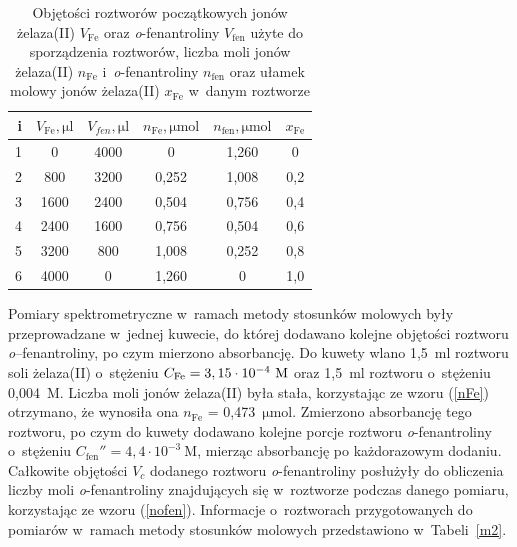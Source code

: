 \documentclass[12pt]{article}
\begin{document}
\begin{table}[H]
    \caption{Objętości roztworów początkowych jonów żelaza(II) $V_{\mathrm{Fe}}$ oraz \textit{o}-fenantroliny $V_{\mathrm{fen}}$ użyte do sporządzenia roztworów, liczba moli jonów żelaza(II) $n_{\mathrm{Fe}}$ i~\textit{o}-fenantroliny $n_{\mathrm{fen}}$ oraz ułamek molowy jonów żelaza(II) $x_{\mathrm{Fe}}$ w~danym roztworze}
    \centering
\begin{tabular}{|r|ccccc|}
\hline
i & $V_{\mathrm{Fe}}, \mathrm{\mu l}$ & $V_{fen}, \mathrm{\mu l}$ & $n_{\mathrm{Fe}}, \mathrm{\mu mol}$ & $n_{\mathrm{fen}}, \mathrm{\mu mol}$ & $x_{\mathrm{Fe}}$ \\ \hline
1 & 0                        & 4000                        & 0                          & 1,260                         & 0        \\
2 & 800                      & 3200                        & 0,252                      & 1,008                         & 0,2      \\
3 & 1600                     & 2400                        & 0,504                      & 0,756                         & 0,4      \\
4 & 2400                     & 1600                        & 0,756                      & 0,504                         & 0,6      \\
5 & 3200                     & 800                         & 1,008                      & 0,252                         & 0,8      \\
6 & 4000                     & 0                           & 1,260                      & 0                             & 1,0      \\ \hline
\end{tabular}
    \label{m1}
\end{table}


Pomiary spektrometryczne w~ramach metody stosunków molowych były przeprowadzane w~jednej kuwecie, do której dodawano kolejne objętości roztworu \textit{o}--fenantroliny, po czym mierzono absorbancję. Do kuwety wlano 1,5~ml roztworu soli żelaza(II) o~stężeniu $C_{\ce{Fe}}= \mathrm{3,15 \cdot 10^{-4}~M}$ oraz 1,5~ml roztworu  o~stężeniu 0,004~M. Liczba moli jonów żelaza(II) była stała, korzystając ze wzoru (\ref{nFe}) otrzymano, że wynosiła ona $n_{\mathrm{Fe}}$ = 0,473~$\mathrm{\mu mol}$. Zmierzono absorbancję tego roztworu, po czym do kuwety dodawano kolejne porcje roztworu \textit{o}-fenantroliny o~stężeniu $C_{\mathrm{fen}}'' = \mathrm{4,4 \cdot 10^{-3}~M}$, mierząc absorbancję po każdorazowym dodaniu.  Całkowite objętości $V_c$ dodanego roztworu \textit{o}-fenantroliny posłużyły do obliczenia liczby moli \textit{o}-fenantroliny znajdujących się w~roztworze podczas danego pomiaru, korzystając ze wzoru (\ref{nofen}). Informacje o~roztworach przygotowanych do pomiarów w~ramach metody stosunków molowych przedstawiono w~Tabeli~\ref{m2}.
\end{document}
